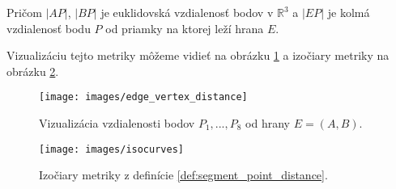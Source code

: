\begin{enumerate}
{\begin{definition}
\begin{itemize}
            
            Pričom $|AP|$, $|BP|$ je euklidovská vzdialenosť bodov v $\mathbb{R}^3$ a $|EP|$ je kolmá 
            vzdialenosť bodu $P$ od priamky na ktorej leží hrana $E$.
        \end{itemize}

        \end{definition}

        Vizualizáciu tejto metriky môžeme vidieť na obrázku \ref{obr:edge_vertex_distance} a izočiary 
        metriky na obrázku \ref{obr:isocurves}.

        \begin{figure}
            \centerline{\texttt{[image: images/edge\_vertex\_distance]}}
            \caption[Vizualizácia vzdialenosti bodov $P_1, ..., P_8$ od hrany $E=(A,B)$]
            {Vizualizácia vzdialenosti bodov $P_1, ..., P_8$ od hrany $E=(A,B)$.}
            \label{obr:edge_vertex_distance}
        \end{figure}

        \begin{figure}
            \centerline{\texttt{[image: images/isocurves]}}
            \caption[Izočiary metriky]
            {Izočiary metriky z definície \ref{def:segment_point_distance}.}
            \label{obr:isocurves}
        \end{figure}



}
\end{enumerate}
